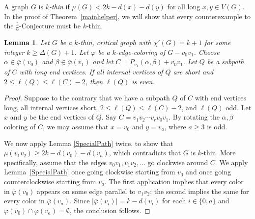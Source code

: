 \documentclass[12pt]{amsart}
\theoremstyle{plain}
\newtheorem{lem}[thm]{Lemma}
\theoremstyle{definition}
\theoremstyle{remark}
\newcommand{\vph}{\varphi}
\newcommand{\vphn}{\overline{\varphi}}
\begin{document}
A graph $G$ is \emph{$k$-thin} if $\mu(G) < 2k - d(x) - d(y)$ for all
long $x,y \in V(G)$.  In the proof of Theorem~\ref{mainhelper}, we will show that
every counterexample to the $\frac56$-Conjecture must be $k$-thin.

\begin{lem}\label{NonSpecialsInThinAreAtEvenDistance}
Let $G$ be a $k$-thin, critical graph with $\chi'(G) = k+1$ for some integer $k \ge \Delta(G) + 1$.
Let $\vph$ be a $k$-edge-coloring of $G-v_0v_1$. Choose $\alpha \in \vphn(v_0)$
and $\beta \in \vphn(v_1)$ and let $C = P_{v_1}(\alpha, \beta) + v_0v_1$.
Let $Q$ be a subpath of $C$ with long end vertices.  If all internal vertices
of $Q$ are short and $2 \le \ell(Q) \le \ell(C) - 2$, then $\ell(Q)$ is even.
\end{lem}
\begin{proof}
Suppose to the contrary that we have a subpath $Q$ of $C$ with end vertices
long, all internal vertices short, $2\le \ell(Q) \le \ell(C) - 2$,
and $\ell(Q)$ odd.  Let $x$ and $y$ be the end vertices of $Q$.
Say $C = v_1v_2\cdots v_rv_0v_1$.  By rotating the $\alpha,\beta$ coloring of
$C$, we may assume that $x = v_0$ and $y = v_a$, where $a \ge 3$ is odd.

We now apply Lemma \ref{SpecialPath} twice, to show that $\mu(v_1v_2) \ge 2k -
d(v_0) - d(v_a)$, which contradicts that $G$ is $k$-thin.  More specifically,
assume that the edges $v_0v_1,v_1v_2,\ldots$ go clockwise around $C$.  We apply
Lemma~\ref{SpecialPath} once going clockwise starting from $v_0$ and once going
counterclockwise starting from $v_a$.  The first application implies that every
color in $\vphn(v_0)$ appears on some edge parallel to $v_1v_2$; the second
implies the same for every color in $\vphn(v_a)$.  Since $|\vphn(v_i)|=k-d(v_i)$
for each $i\in\{0,a\}$ and $\vphn(v_0)\cap \vphn(v_a)=\emptyset$, the conclusion
follows.
\end{proof}
\end{document}

